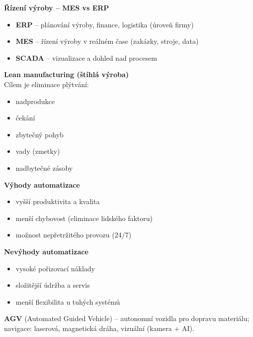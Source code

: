 \documentclass[a4paper,10pt]{article}
\begin{document}
\begin{vysvetlenibox}
\textbf{Řízení výroby -- MES vs ERP}\\
\begin{itemize}[noitemsep, leftmargin=1.4em, topsep=4pt]
    \item \textbf{ERP} -- plánování výroby, finance, logistika (úroveň firmy)
    \item \textbf{MES} -- řízení výroby v reálném čase (zakázky, stroje, data)
    \item \textbf{SCADA} -- vizualizace a dohled nad procesem
\end{itemize}

\textbf{Lean manufacturing (štíhlá výroba)}\\
Cílem je eliminace plýtvání:
\begin{itemize}[noitemsep, leftmargin=1.4em, topsep=4pt]
    \item nadprodukce
    \item čekání
    \item zbytečný pohyb
    \item vady (zmetky)
    \item nadbytečné zásoby
\end{itemize}

\textbf{Výhody automatizace}
\begin{itemize}[noitemsep, leftmargin=1.4em, topsep=4pt]
    \item vyšší produktivita a kvalita
    \item menší chybovost (eliminace lidského faktoru)
    \item možnost nepřetržitého provozu (24/7)
\end{itemize}

\textbf{Nevýhody automatizace}
\begin{itemize}[noitemsep, leftmargin=1.4em, topsep=4pt]
    \item vysoké pořizovací náklady
    \item složitější údržba a servis
    \item menší flexibilita u tuhých systémů
\end{itemize}

\textbf{AGV} (Automated Guided Vehicle) -- autonomní vozidla pro dopravu
materiálu; navigace: laserová, magnetická dráha, vizuální (kamera + AI).
\end{vysvetlenibox}


\end{document}
